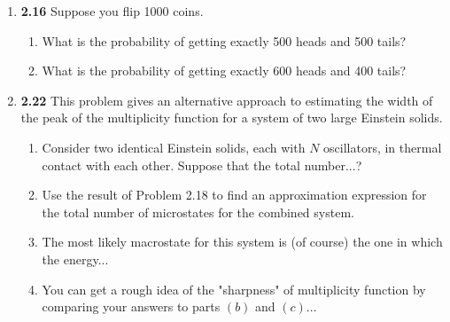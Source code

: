 \documentclass[fleqn]{article}
\begin{document}
\begin{enumerate}
    \item \textbf{2.16} Suppose you flip 1000 coins.
    \begin{enumerate}
      \item What is the probability of getting exactly 500 heads and 500 tails?


      \item What is the probability of getting exactly 600 heads and 400 tails?


    \end{enumerate}

    \item \textbf{2.22} This problem gives an alternative approach to estimating the width of the peak of the multiplicity 
    function for a system of two large Einstein solids.
    \begin{enumerate}
      \item Consider two identical Einstein solids, each with $N$ oscillators, in thermal contact with each other. Suppose
      that the total number...?


      \item Use the result of Problem 2.18 to find an approximation expression for the total number of microstates for 
      the combined system.


      \item The most likely macrostate for this system is (of course) the one in which the energy...


      \item You can get a rough idea of the "sharpness" of multiplicity function by comparing your answers to parts $(b)$
      and $(c)$...


    \end{enumerate}


\end{enumerate}
\end{document}
